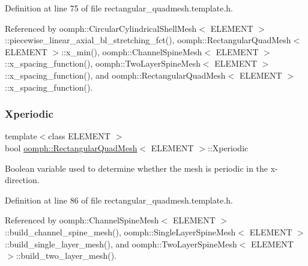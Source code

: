Definition at line 75 of file rectangular\+\_\+quadmesh.\+template.\+h.



Referenced by oomph\+::\+Circular\+Cylindrical\+Shell\+Mesh$<$ E\+L\+E\+M\+E\+N\+T $>$\+::piecewise\+\_\+linear\+\_\+axial\+\_\+bl\+\_\+stretching\+\_\+fct(), oomph\+::\+Rectangular\+Quad\+Mesh$<$ E\+L\+E\+M\+E\+N\+T $>$\+::x\+\_\+min(), oomph\+::\+Channel\+Spine\+Mesh$<$ E\+L\+E\+M\+E\+N\+T $>$\+::x\+\_\+spacing\+\_\+function(), oomph\+::\+Two\+Layer\+Spine\+Mesh$<$ E\+L\+E\+M\+E\+N\+T $>$\+::x\+\_\+spacing\+\_\+function(), and oomph\+::\+Rectangular\+Quad\+Mesh$<$ E\+L\+E\+M\+E\+N\+T $>$\+::x\+\_\+spacing\+\_\+function().

\mbox{\label{classoomph_1_1RectangularQuadMesh_a83dd0ace2eb47449f5e30522f71d9f59}} 
\subsubsection{\texorpdfstring{Xperiodic}{Xperiodic}}
{\footnotesize\ttfamily template$<$class E\+L\+E\+M\+E\+NT $>$ \\
bool \hyperlink{classoomph_1_1RectangularQuadMesh}{oomph\+::\+Rectangular\+Quad\+Mesh}$<$ E\+L\+E\+M\+E\+NT $>$\+::Xperiodic\hspace{0.3cm}{\ttfamily [protected]}}



Boolean variable used to determine whether the mesh is periodic in the x-\/direction. 



Definition at line 86 of file rectangular\+\_\+quadmesh.\+template.\+h.



Referenced by oomph\+::\+Channel\+Spine\+Mesh$<$ E\+L\+E\+M\+E\+N\+T $>$\+::build\+\_\+channel\+\_\+spine\+\_\+mesh(), oomph\+::\+Single\+Layer\+Spine\+Mesh$<$ E\+L\+E\+M\+E\+N\+T $>$\+::build\+\_\+single\+\_\+layer\+\_\+mesh(), and oomph\+::\+Two\+Layer\+Spine\+Mesh$<$ E\+L\+E\+M\+E\+N\+T $>$\+::build\+\_\+two\+\_\+layer\+\_\+mesh().

\mbox{\label{classoomph_1_1RectangularQuadMesh_aacbacc3a0e6ea8508abb3140ba343ffa}} 
